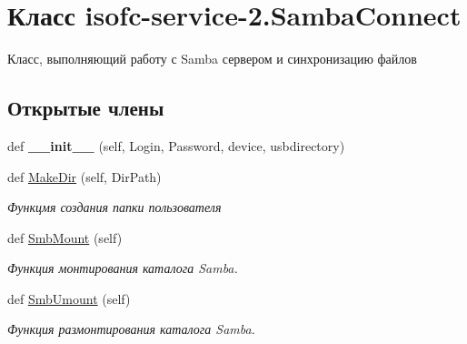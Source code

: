 \hypertarget{classisofc-service-2_1_1SambaConnect}{}\section{Класс isofc-\/service-\/2.Samba\+Connect}
\label{classisofc-service-2_1_1SambaConnect}


Класс, выполняющий работу с Samba сервером и синхронизацию файлов  


\subsection*{Открытые члены}
\begin{DoxyCompactItemize}
\item 
\mbox{\label{classisofc-service-2_1_1SambaConnect_aae29c117ab0c323791965e9c0868c076}} 
def {\bfseries \+\_\+\+\_\+init\+\_\+\+\_\+} (self, Login, Password, device, usbdirectory)
\item 
\mbox{\label{classisofc-service-2_1_1SambaConnect_aba9497c7f3dbe0cb8c842abba153b595}} 
def \mbox{\hyperlink{classisofc-service-2_1_1SambaConnect_aba9497c7f3dbe0cb8c842abba153b595}{Make\+Dir}} (self, Dir\+Path)
\begin{DoxyCompactList}\small\item\em Функцмя создания папки пользователя \end{DoxyCompactList}\item 
\mbox{\label{classisofc-service-2_1_1SambaConnect_addb9d89c15f2c307eb03953299c5cd0a}} 
def \mbox{\hyperlink{classisofc-service-2_1_1SambaConnect_addb9d89c15f2c307eb03953299c5cd0a}{Smb\+Mount}} (self)
\begin{DoxyCompactList}\small\item\em Функция монтирования каталога Samba. \end{DoxyCompactList}\item 
\mbox{\label{classisofc-service-2_1_1SambaConnect_a52ab5b1d675df966789e98417e4b187c}} 
def \mbox{\hyperlink{classisofc-service-2_1_1SambaConnect_a52ab5b1d675df966789e98417e4b187c}{Smb\+Umount}} (self)
\begin{DoxyCompactList}\small\item\em Функция размонтирования каталога Samba. \end{DoxyCompactList}\item 

\end{DoxyCompactItemize}
